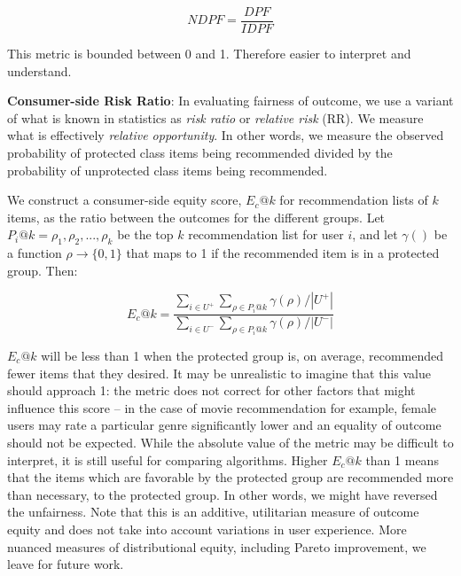         \begin{equation*}
            NDPF = \frac{DPF}{IDPF}
        \end{equation*}

        This metric is bounded between 0 and 1. Therefore easier to interpret and understand.
        
        
        
        \textbf{Consumer-side Risk Ratio}: In evaluating fairness of outcome, we use a variant of what is known in statistics as \textit{risk ratio} or \textit{relative risk} (RR)\cite{romei2014multidisciplinary}. We measure what is effectively \textit{relative opportunity}. In other words, we measure the observed probability of protected class items being recommended divided by the probability of unprotected class items being recommended.
        
        We construct a consumer-side equity score, $E_c@k$ for recommendation lists of $k$ items, as the ratio between the outcomes for the different groups. Let $P_i@k = {\rho_1, \rho_2, ..., \rho_k}$ be the top $k$ recommendation list for user $i$, and let $\gamma()$ be a function $\rho \rightarrow \{0,1\}$ that maps to 1 if the recommended item is in a protected group. Then:

        \begin{equation}
        E_c@k=\frac{\sum_{i \in U^+}{\sum_{\rho \in P_i@k}{\gamma(\rho)}}/|U^+|}
        {\sum_{i \in U^-}{\sum_{\rho \in P_i@k}{\gamma(\rho)}}/|U^-|}
        \end{equation}
        
        
        $E_c@k$ will be less than 1 when the protected group is, on average, recommended fewer items that they desired. It may be unrealistic to imagine that this value should approach 1: the metric does not correct for other factors that might influence this score -- in the case of movie recommendation for example, female users may rate a particular genre significantly lower and an equality of outcome should not be expected.
        While the absolute value of the metric may be difficult to interpret, it is still useful for comparing algorithms. Higher $E_c@k$ than 1 means that the items which are favorable by the protected group are recommended more than necessary, to the protected group. In other words, we might have reversed the unfairness. Note that this is an additive, utilitarian measure of outcome equity and does not take into account variations in user experience. More nuanced measures of distributional equity, including Pareto improvement, we leave for future work.
        

